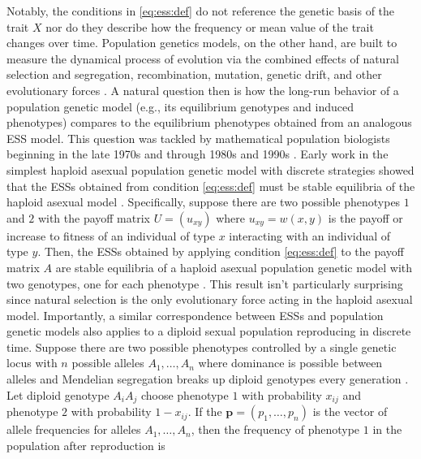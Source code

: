\documentclass[11pt]{article}
\newcommand{\w}{w}
\renewcommand{\vec}[1]{\symbf{#1}}
\begin{document}
Notably, the conditions in \eqref{eq:ess:def} do not reference the genetic basis of the trait $X$ nor do they describe how the frequency or mean value of the trait changes over time. Population genetics models, on the other hand, are built to measure the dynamical process of evolution via the combined effects of natural selection and segregation, recombination, mutation, genetic drift, and other evolutionary forces \cite{Crow:Kimura:1970,Ewens:2004}. A natural question then is how the long-run behavior of a population genetic model (e.g., its equilibrium genotypes and induced phenotypes) compares to the equilibrium phenotypes obtained from an analogous ESS model. This question was tackled by mathematical population biologists beginning in the late 1970s and through 1980s and 1990s \cite[e..g,][]{Taylor:Jonker:1978,Hofbauer:Schuster:1979,Zeeman:1980,Eshel:1982,Hofbauer:Schuster:1982,Lessard:1984,Cressman:1988,Cressman:Hines:1984,Cressman:Hofbauer:1996,Hammerstein:1996,Weissing:1996,Eshel:1996,Eshel:Feldman:1984}. Early work in the simplest haploid asexual population genetic model with discrete strategies showed that the ESSs obtained from condition \eqref{eq:ess:def} must be stable equilibria of the haploid asexual model \cite{Taylor:Jonker:1978,Hofbauer:Schuster:1979,Zeeman:1980}. Specifically, suppose there are two possible phenotypes $1$ and $2$ with the payoff matrix $U = (u_{xy})$ where $u_{xy} = \w(x,y)$ is the payoff or increase to fitness of an individual of type $x$ interacting with an individual of type $y$. Then, the ESSs obtained by applying condition \eqref{eq:ess:def} to the payoff matrix $A$ are stable equilibria of a haploid asexual population genetic model with two genotypes, one for each phenotype \cite{Taylor:Jonker:1978,Hofbauer:Schuster:1979,Zeeman:1980,Hofbauer:Sigmund:1998}. This result isn't particularly surprising since natural selection is the only evolutionary force acting in the haploid asexual model. Importantly, a similar  correspondence between ESSs and population genetic models also applies to a diploid sexual population reproducing in discrete time. Suppose there are two possible phenotypes controlled by a single genetic locus with $n$ possible alleles $A_{1},\ldots,A_{n}$ where dominance is possible between alleles and Mendelian segregation breaks up diploid genotypes every generation \cite{Eshel:1982,Lessard:1984}. Let diploid genotype $A_{i} A_{j}$ choose phenotype $1$ with probability $x_{ij}$ and phenotype $2$ with probability $1-x_{ij}$. If the $\vec{p} = (p_{1}, \ldots, p_{n})$ is the vector of allele frequencies for alleles $A_{1},\ldots,A_{n}$, then the frequency of phenotype $1$ in the population after reproduction is
\end{document}

